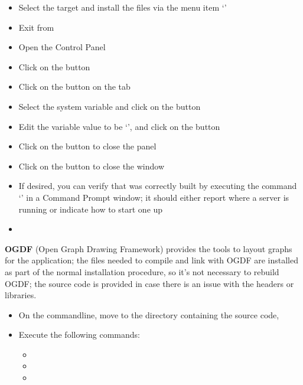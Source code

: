 \begin{itemize}
`'
\item\exSp{} Select the  target and install the  files via
the menu item `'
\item\exSp{} Exit from 
\item\exSp{} Open the  Control Panel
\item\exSp{} Click on the  button
\item\exSp{} Click on the  button on the 
tab
\item\exSp{} Select the  system variable and click on the
 button 
\item\exSp{} Edit the variable value to be
`', and click on the 
button
\item\exSp{} Click on the  button to close the 
panel
\item\exSp{} Click on the  button to close the 
window
\item\exSp{} If desired, you can verify that \yarp{} was correctly built by executing the
command `' in a Command Prompt window; it should either report where a
\yarp{} server is running or indicate how to start one up
\end{itemize}
\tertiaryEnd
{}
\begin{itemize}
\item\TBD
\end{itemize}
\tertiaryEnd
\secondaryEnd
{}
\textbf{OGDF} (Open Graph Drawing Framework) provides the tools to layout graphs for the
\CMU{} application; the files needed to compile and link with OGDF are
installed as part of the normal \mplusm{} installation procedure, so it's not necessary to
rebuild OGDF; the source code is provided in case there is an issue with the headers or
libraries.
\begin{itemize}
\item On the command\longDash{}line, move to the directory containing the \mplusm{} source
code, 
\item\exSp{} Execute the following commands:
\begin{itemize}
\item{}
\item\exSp{}
\item\exSp{}
\end{itemize}
\end{itemize}
